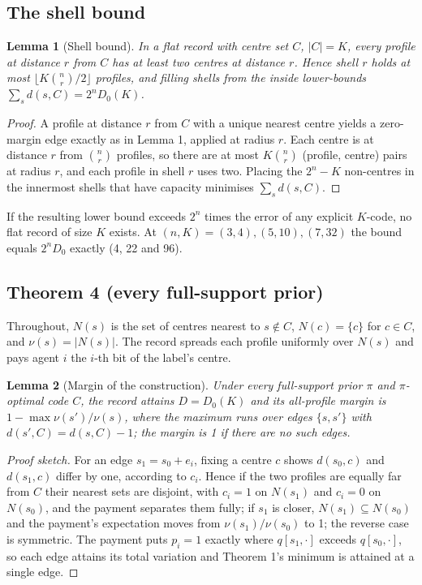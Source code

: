 \documentclass[sigconf,anonymous,acmthm=false]{acmart}
\theoremstyle{acmplain}
\newtheorem{slemma}{Lemma}
\theoremstyle{acmdefinition}
\begin{document}
\subsection{The shell bound}
\begin{slemma}[Shell bound]\label{lem:shell}
In a flat record with centre set $C$, $|C|=K$, every profile at distance $r$ from $C$ has at
least two centres at distance $r$. Hence shell $r$ holds at most $\lfloor K\binom nr/2\rfloor$
profiles, and filling shells from the inside lower-bounds $\sum_sd(s,C)=2^nD_0(K)$.
\end{slemma}
\begin{proof}
A profile at distance $r$ from $C$ with a unique nearest centre yields a zero-margin edge
exactly as in Lemma 1, applied at radius $r$. Each centre is at distance $r$ from
$\binom nr$ profiles, so there are at most $K\binom nr$ (profile, centre) pairs at radius
$r$, and each profile in shell $r$ uses two. Placing the $2^n-K$ non-centres in the
innermost shells that have capacity minimises $\sum_sd(s,C)$.
\end{proof}
If the resulting lower bound exceeds $2^n$ times the error of any explicit $K$-code, no flat
record of size $K$ exists. At $(n,K)=(3,4),(5,10),(7,32)$ the bound equals $2^nD_0$ exactly
(4, 22 and 96).

\subsection{Theorem 4 (every full-support prior)}
Throughout, $N(s)$ is the set of centres nearest to $s\notin C$, $N(c)=\{c\}$ for $c\in C$,
and $\nu(s)=|N(s)|$. The record spreads each profile uniformly over $N(s)$ and pays agent
$i$ the $i$-th bit of the label's centre.

\begin{slemma}[Margin of the construction]\label{lem:gen-margin}
Under every full-support prior $\pi$ and $\pi$-optimal code $C$, the record attains
$D=D_0(K)$ and its all-profile margin is $1-\max\nu(s')/\nu(s)$, where the maximum runs over
edges $\{s,s'\}$ with $d(s',C)=d(s,C)-1$; the margin is 1 if there are no such edges.
\end{slemma}
\begin{proof}[Proof sketch]
For an edge $s_1=s_0+e_i$, fixing a centre $c$ shows $d(s_0,c)$ and $d(s_1,c)$ differ by
one, according to $c_i$. Hence if the two profiles are equally far from $C$ their nearest
sets are disjoint, with $c_i=1$ on $N(s_1)$ and $c_i=0$ on $N(s_0)$, and the payment
separates them fully; if $s_1$ is closer, $N(s_1)\subseteq N(s_0)$ and the payment's
expectation moves from $\nu(s_1)/\nu(s_0)$ to 1; the reverse case is symmetric. The payment
puts $p_i=1$ exactly where $q[s_1,\cdot]$ exceeds $q[s_0,\cdot]$, so each edge attains its
total variation and Theorem 1's minimum is attained at a single edge.
\end{proof}
\end{document}
